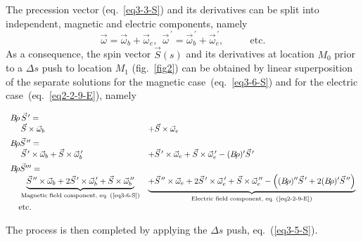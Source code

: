 \noindent The precession vector (eq.~\ref{eq3-3-S}) and its derivatives 
can be split into independent, magnetic and electric components, namely
$$  \vec \omega = \vec \omega_b + \vec \omega_e , ~ ~ \vec \omega^{\,\prime} = \vec \omega_b^{\,\prime} + \vec \omega_e^{\,\prime}  , ~ ~ ~ \textrm{~ ~  ~ etc.}$$
 As a consequence, 
the  spin vector $\vec S(s)$ and its derivatives  at location $M_0$ prior to a $\Delta s$  push to 
location $M_1$ (fig.~\ref{fig2})
can be  obtained by linear superposition of the separate solutions 
for the magnetic case~(eq.~\ref{eq3-6-S}) and for the electric case~(eq.~\ref{eq2-2-9-E}), namely

{%
\begin{equation}
	\label{eq2-2-9-EB}
	\begin{array}{lll}	 
	 \multicolumn{3}{l}{\Br \, \vec S^{\,\prime} =}   \\
 & \hspace{-8mm} \vec  S \times \vec \omega_b  
 & + \vec  S \times \vec \omega_e    \\[1ex]
    	 \multicolumn{3}{l}{\Br\vec  S^{\,\prime\prime} =}  \\
 &  \hspace{-8mm}  \vec  S^{\,\prime}  \times \vec \omega_b + \vec  S \times \vec \omega_b^{\,\prime} 
 &  +    \vec  S^{\,\prime}  \times \vec \omega_e + \vec  S \times \vec \omega_e^{\,\prime} 
          - (\Br)^\prime \vec  S^{\,\prime}    \\[1ex]
   	 \multicolumn{3}{l}{\Br\vec  S^{\prime\prime\prime} =}  \\
  & \hspace{-8mm} \underbrace{
\vec  S^{\,\prime\prime}  \times \vec \omega_b + 2\vec  S^{\,\prime} \times \vec \omega_b^{\,\prime}   + \vec S \times \vec \omega_b^{\,\prime\prime} 
              }_{\textrm{Magnetic field component, eq.~(\ref{eq3-6-S})}}  
&   \underbrace{ 
     + \vec  S^{\,\prime\prime}  \times \vec \omega_e + 2\vec  S^{\,\prime} \times \vec \omega_e^{\,\prime}   + \vec S \times \vec \omega_e^{\,\prime\prime}    
    -\left(  (\Br)^{\prime\prime}\vec  S^{\,\prime}
		      + 2 (\Br)^\prime \vec  S^{\,\prime\prime}  \right) 
               }_{\textrm{Electric field component, eq.~(\ref{eq2-2-9-E})}}     \\
          ~ ~  ~      \textrm{etc.}
	\end{array}
\end{equation} 
}%

\noindent The process is then completed by applying the $\Delta s$ push, eq.~(\ref{eq3-5-S}). 




